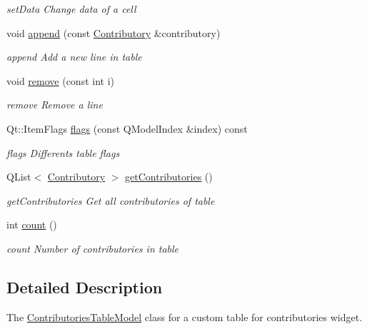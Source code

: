 \begin{DoxyCompactItemize}
\begin{DoxyCompactList}\small\item\em set\+Data Change data of a cell \end{DoxyCompactList}\item 
void \hyperlink{classContributoriesTableModel_a940072d62162b130bfd0cec0c6fd4567}{append} (const \hyperlink{classContributory}{Contributory} \&contributory)
\begin{DoxyCompactList}\small\item\em append Add a new line in table \end{DoxyCompactList}\item 
void \hyperlink{classContributoriesTableModel_a00354b1b323c7d74d9cdef3333ef4df2}{remove} (const int i)
\begin{DoxyCompactList}\small\item\em remove Remove a line \end{DoxyCompactList}\item 
Qt\+::\+Item\+Flags \hyperlink{classContributoriesTableModel_a7be83a445e2b0cc5b9751691ed33499b}{flags} (const Q\+Model\+Index \&index) const 
\begin{DoxyCompactList}\small\item\em flags Differents table flags \end{DoxyCompactList}\item 
Q\+List$<$ \hyperlink{classContributory}{Contributory} $>$ \hyperlink{classContributoriesTableModel_ae0aaacde6e79ccda128f589375f75e84}{get\+Contributories} ()
\begin{DoxyCompactList}\small\item\em get\+Contributories Get all contributories of table \end{DoxyCompactList}\item 
int \hyperlink{classContributoriesTableModel_a9bc91f439c8b8320e64ef0531e8d5c62}{count} ()
\begin{DoxyCompactList}\small\item\em count Number of contributories in table \end{DoxyCompactList}\end{DoxyCompactItemize}


\subsection{Detailed Description}
The \hyperlink{classContributoriesTableModel}{Contributories\+Table\+Model} class for a custom table for contributories widget. 


